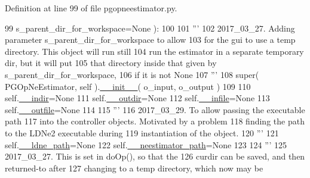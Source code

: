 Definition at line 99 of file pgopneestimator.\+py.


\begin{DoxyCode}
99                                     s\_parent\_dir\_for\_workspace=\textcolor{keywordtype}{None} ):
100 
101         \textcolor{stringliteral}{'''}
102 \textcolor{stringliteral}{        2017\_03\_27. Adding parameter s\_parent\_dir\_for\_workspace to allow}
103 \textcolor{stringliteral}{        for the gui to use a temp directory.  This object will run still}
104 \textcolor{stringliteral}{        run the estimator in a separate temporary dir, but it will put}
105 \textcolor{stringliteral}{        that directory inside that given by s\_parent\_dir\_for\_workspace,}
106 \textcolor{stringliteral}{        if it is not None}
107 \textcolor{stringliteral}{        '''}
108         super( PGOpNeEstimator, self ).\hyperlink{classnegui_1_1pgopneestimator_1_1PGOpNeEstimator_afa820d0b45ef47e2fd9b5dbbc3978375}{\_\_init\_\_}( o\_input, o\_output )
109 
110         self.\hyperlink{classnegui_1_1pgopneestimator_1_1PGOpNeEstimator_a3ff367d5058faad36ad0d4ac1d420e53}{\_\_indir}=\textcolor{keywordtype}{None}
111         self.\hyperlink{classnegui_1_1pgopneestimator_1_1PGOpNeEstimator_a428a0896f7303229c34071c963e1be58}{\_\_outdir}=\textcolor{keywordtype}{None}
112         self.\hyperlink{classnegui_1_1pgopneestimator_1_1PGOpNeEstimator_ad467601bda091e5759650b801a509612}{\_\_infile}=\textcolor{keywordtype}{None}
113         self.\hyperlink{classnegui_1_1pgopneestimator_1_1PGOpNeEstimator_a0e1f25befda8ec3b052e98ed4db9ea5d}{\_\_outfile}=\textcolor{keywordtype}{None}
114 
115         \textcolor{stringliteral}{'''}
116 \textcolor{stringliteral}{        2017\_03\_29.  To allow passing the executable path}
117 \textcolor{stringliteral}{        into the controller objects.  Motivated by a problem}
118 \textcolor{stringliteral}{        finding the path to the LDNe2 executable during}
119 \textcolor{stringliteral}{        instantiation of the object.}
120 \textcolor{stringliteral}{        '''}
121         self.\hyperlink{classnegui_1_1pgopneestimator_1_1PGOpNeEstimator_a3e78995efb0929fd49e1d574577be1bf}{\_\_ldne\_path}=\textcolor{keywordtype}{None}
122         self.\hyperlink{classnegui_1_1pgopneestimator_1_1PGOpNeEstimator_a3b01d4a2bccff9d1799675f64cf07d42}{\_\_neestimator\_path}=\textcolor{keywordtype}{None}
123 
124         \textcolor{stringliteral}{'''}
125 \textcolor{stringliteral}{        2017\_03\_27.  This is set in doOp(), so that the}
126 \textcolor{stringliteral}{        curdir can be saved, and then returned-to after}
127 \textcolor{stringliteral}{        changing to a temp directory, which now may be}

\end{DoxyCode}
